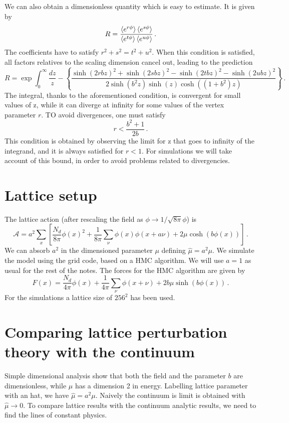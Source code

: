 \documentclass[12pt,a4paper]{report}
\begin{document}
We can also obtain a dimensionless quantity which is easy to estimate. It is given by \begin{equation}
R = \dfrac{\braket{e^{r\phi}} \braket{e^{s \phi}} }{ \braket{e^{t \phi}} \braket{e^{u \phi}} } \,.
\end{equation} The coefficients have to satisfy $r^2+s^2 = t^2 +u^2$. When this condition is satisfied, all factors relatives to the scaling dimension cancel out, leading to the prediction \begin{equation}
R =  \exp \int_0^\infty \dfrac{dz}{z} - \left\{ \dfrac{\sinh(2rbz)^2+ \sinh(2sbz)^2- \sinh(2tbz)^2- \sinh(2ubz)^2 }{2 \sinh(b^2 z) \sinh(z) \cosh((1+b^2)z) } \right\} \,.
\end{equation} The integral, thanks to the aforementioned condition, is convergent for small values of z, while it can diverge at infinity for some values of the vertex parameter $r$. TO avoid divergences,  one must satisfy \begin{equation}
r < \dfrac{b^2+1}{2b} \,.
\end{equation} This condition is obtained by observing the limit for z that goes to infinity of the integrand, and it is always satisfied for $r<1$. For simulations we will take account of this bound, in order to avoid problems related to divergencies.


\chapter{Lattice setup}
\label{sec:lattice_setup}
The lattice action (after rescaling the field as $\phi \to 1/\sqrt{8 \pi} \phi $) is \begin{equation}
\mathcal{A} = a^2 \sum_x \left[ \dfrac{N_d}{8 \pi} \phi(x)^2 + \dfrac{1}{8\pi} \sum_\nu \phi(x) \phi(x+ a \nu) +2  \mu \cosh(b\phi(x)) \right] \,.
\end{equation} We can absorb $a^2$ in the dimensioned parameter $\mu$ defining $\hat \mu = a^2 \mu$. We simulate the model using the grid code, based on a HMC algorithm. We will use $a=1$ as usual for the rest of the notes.
The forces for the HMC algorithm are given by \begin{equation}
F(x) = \dfrac{N_d}{4 \pi} \phi(x) + \dfrac{1}{4 \pi} \sum_{\nu}\phi(x+ \nu) + 2 b \mu \sinh(b\phi(x)) \,.
\end{equation} For the simulations a lattice size of $256^2$ has been used.

\chapter{Comparing lattice perturbation theory with the continuum }
\label{sec:lattice_pt}
Simple dimensional analysis show that both the field and the parameter $b$ are dimensionless, while $\mu$ has a dimension 2 in energy. Labelling lattice parameter with an hat, we have $\hat \mu = a^2 \mu$. Naively the continuum is limit is obtained  with $\hat \mu \to 0$. To compare lattice results with the continuum analytic results, we need to find the lines of constant physics.
\end{document}
